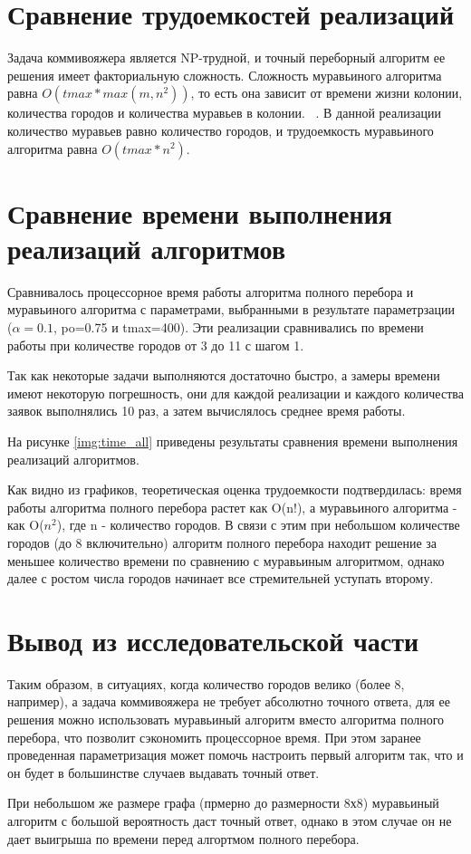 \section{Сравнение трудоемкостей реализаций}

Задача коммивояжера является NP-трудной, и точный переборный алгоритм ее решения имеет факториальную сложность. Сложность муравьиного алгоритма равна $O(tmax*max(m, n^2))$, то есть она зависит от времени жизни колонии, количества городов и количества муравьев в колонии.  ~\cite{first_article}. В данной реализации количество муравьев равно количество городов, и трудоемкость муравьиного алгоритма равна $O(tmax * n^2)$.

\section{Сравнение времени выполнения реализаций алгоритмов}

Сравнивалось процессорное время работы алгоритма полного перебора и муравьиного алгоритма с параметрами, выбранными в результате параметрзации ($\alpha=0.1$, po=0.75 и tmax=400). Эти реализации сравнивались по времени работы при количестве городов от 3 до 11 с шагом 1.
 
Так как некоторые задачи выполняются достаточно быстро, а замеры времени имеют некоторую погрешность, они для каждой реализации и каждого количества заявок выполнялись 10 раз, а затем вычислялось среднее время работы.
 

На рисунке \ref{img:time_all} приведены результаты сравнения времени выполнения реализаций алгоритмов. 

\clearpage
{}

Как видно из графиков, теоретическая оценка трудоемкости подтвердилась: время работы алгоритма полного перебора растет как O(n!), а муравьиного алгоритма - как O($n^2$), где n - количество городов. В связи с этим при небольшом количестве городов (до 8 включительно) алгоритм полного перебора находит решение за меньшее количество времени по сравнению с муравьиным алгоритмом, однако далее с ростом числа городов начинает все стремительней уступать второму.


\section{Вывод из исследовательской части}

Таким образом, в ситуациях, когда количество городов велико (более 8, например), а задача коммивояжера не требует абсолютно точного ответа, для ее решения можно использовать муравьиный алгоритм вместо алгоритма полного перебора, что позволит сэкономить процессорное время. При этом заранее проведенная параметризация может помочь настроить первый алгоритм так, что и он будет в большинстве случаев выдавать точный ответ. 

При небольшом же размере графа (прмерно до размерности 8х8) муравьиный алгоритм с большой вероятность даст точный ответ, однако в этом случае он не дает выигрыша по времени перед алгортмом полного перебора.